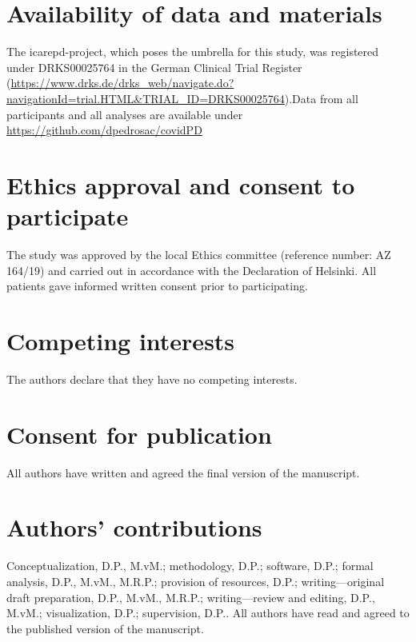 \documentclass{bmcart}
\begin{document}
\begin{backmatter}
\section*{Availability of data and materials}
The \acs{icarepd}-project, which poses the umbrella for this study, was registered under DRKS00025764 in the German Clinical Trial Register (\url{https://www.drks.de/drks_web/navigate.do?navigationId=trial.HTML&TRIAL_ID=DRKS00025764}).Data from all participants and all analyses are available under \url{https://github.com/dpedrosac/covidPD}

\section*{Ethics approval and consent to participate}%
The study was approved by the local Ethics committee (reference number: AZ 164/19) and carried out in accordance with the Declaration of Helsinki. All patients gave informed written consent prior to participating. 

\section*{Competing interests}
The authors declare that they have no competing interests.

\section*{Consent for publication}%
All authors have written and agreed the final version of the manuscript. 

\section*{Authors' contributions}
Conceptualization, D.P., M.vM.; methodology, D.P.; software, D.P.; formal analysis, D.P., M.vM., M.R.P.; provision of resources, D.P.; writing—original draft preparation, D.P., M.vM., M.R.P.; writing—review and editing, D.P., M.vM.; visualization, D.P.; supervision, D.P.. All authors have read and agreed to the published version of the manuscript.




\end{backmatter}
\end{document}
